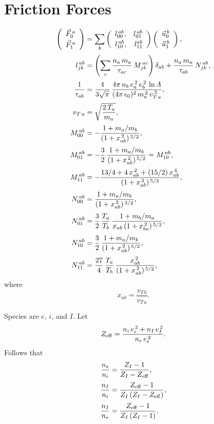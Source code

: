 \documentclass[notitlepage,12pt]{article}
\begin{document}
\section{Friction Forces}
\begin{align}
\left(\begin{array}{c}\vec{F}_{0}^{\,a}\\[0.5ex]\vec{F}_{1}^{\,a}\end{array}\right)&=\sum_b\left(
\begin{array}{rr} l_{00}^{\,ab},&l_{01}^{\,ab}\\[0.5ex]
l_{10}^{\,ab},&l_{11}^{ab}\end{array}\right)\left(\begin{array}{c}\vec{ u}_{0}^{\,b}\\[0.5ex]\vec{u}_{1}^{\,b}\end{array}\right),\\[0.5ex]
l_{jk}^{\,ab}&= \left(\sum_c \frac{n_a\,m_a}{\tau_{ac}}\,M^{\,ac}_{jk}\right)\delta_{ab} +\frac{n_a\,m_a}{\tau_{ab}}\,N^{\,ab}_{jk},\\[0.5ex]
\frac{1}{\tau_{ab}} &= \frac{4}{3\sqrt{\pi}}\,\frac{4\pi\,n_b\,e_a^{\,2}\,e_b^{\,2}\,\ln{\mit\Lambda}}{(4\pi\,\epsilon_0)^2 \,m_a^{\,2}\,v_{T\,a}^{\,3}},\\[0.5ex]
v_{T\,a} &= \sqrt{\frac{2\,T_a}{m_a}},\\[0.5ex]
M^{\,ab}_{00} &= -\frac{1+m_a/m_b}{(1+x_{ab}^{\,2})^{\,3/2}},\\[0.5ex]
M^{\,ab}_{01}&= -\frac{3}{2}\,\frac{1+m_a/m_b}{(1+x_{ab}^{\,2})^{\,5/2}}= M^{\,ab}_{10},\\[0.5ex]
M^{\,ab}_{11}& = -\frac{13/4 + 4\,x_{ab}^{\,2} + (15/2)\,x_{ab}^{\,4}}{(1+x_{ab}^{\,2})^{\,5/2}},\\[0.5ex]
N^{\,ab}_{00} &= \frac{1+m_a/m_b}{(1+x_{ab}^{\,2})^{\,3/2}},\\[0.5ex]
N^{\,ab}_{01}&= \frac{3}{2}\,\frac{T_a}{T_b}\,\frac{1+m_b/m_a}{x_{ab}\,(1+x_{ba}^{\,2})^{\,5/2}},\\[0.5ex]
N^{\,ab}_{10}&= \frac{3}{2}\,\frac{1+m_a/m_b}{(1+x_{ab}^{\,2})^{\,5/2}},\\[0.5ex]
N^{\,ab}_{11}& =\frac{27}{4}\,\frac{T_a}{T_b}\,\frac{x_{ab}^{\,2}}{(1+x_{ab}^{\,2})^{\,5/2}},
\end{align}
where 
\begin{equation}
x_{ab}=\frac{v_{T\,b}}{v_{T\,a}}.
\end{equation} 

Species are $e$, $i$, and $I$. Let 
\begin{equation}
Z_{\rm eff}= \frac{n_i\,e_i^{\,2}+n_I\,e_I^{\,2}}{n_e\,e_e^{\,2}}.
\end{equation} 
Follows that
\begin{align}
\frac{n_e}{n_i} &= \frac{Z_I-1}{Z_I-Z_{\rm eff}},\\[0.5ex]
\frac{n_I}{n_i} &=\frac{Z_{\rm eff}-1}{Z_I\,(Z_I-Z_{\rm eff})},\\[0.5ex]
\frac{n_I}{n_e} &= \frac{Z_{\rm eff}-1}{Z_I\,(Z_I-1)}.
\end{align}
\end{document}
